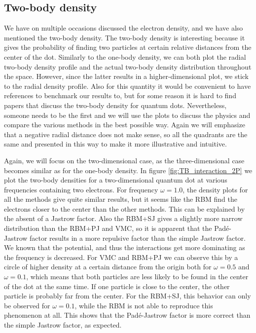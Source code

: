 \subsection{Two-body density}
We have on multiple occasions discussed the electron density, and we have also mentioned the two-body density. The two-body density is interesting because it gives the probability of finding two particles at certain relative distances from the center of the dot. Similarly to the one-body density, we can both plot the radial two-body density profile and the actual two-body density distribution throughout the space. However, since the latter results in a higher-dimensional plot, we stick to the radial density profile. Also for this quantity it would be convenient to have references to benchmark our results to, but for some reason it is hard to find papers that discuss the two-body density for quantum dots. Nevertheless, someone needs to be the first and we will use the plots to discuss the physics and compare the various methods in the best possible way. Again we will emphasize that a negative radial distance does not make sense, so all the quadrants are the same and presented in this way to make it more illustrative and intuitive.

Again, we will focus on the two-dimensional case, as the three-dimensional case becomes similar as for the one-body density. In figure \eqref{fig:TB_interaction_2P} we plot the two-body densities for a two-dimensional quantum dot at various frequencies containing two electrons. For frequency $\omega=1.0$, the density plots for all the methods give quite similar results, but it seems like the RBM find the electrons closer to the center than the other methods. This can be explained by the absent of a Jastrow factor. Also the RBM+SJ gives a slightly more narrow distribution than the RBM+PJ and VMC, so it is apparent that the Padé-Jastrow factor results in a more repulsive factor than the simple Jastrow factor. We known that the potential, and thus the interactions get more dominating as the frequency is decreased. For VMC and RBM+PJ we can observe this by a circle of higher density at a certain distance from the origin both for $\omega=0.5$ and $\omega=0.1$, which means that both particles are less likely to be found in the center of the dot at the same time. If one particle is close to the center, the other particle is probably far from the center. For the RBM+SJ, this behavior can only be observed for $\omega=0.1$, while the RBM is not able to reproduce this phenomenon at all. This shows that the Padé-Jastrow factor is more correct than the simple Jastrow factor, as expected. 

